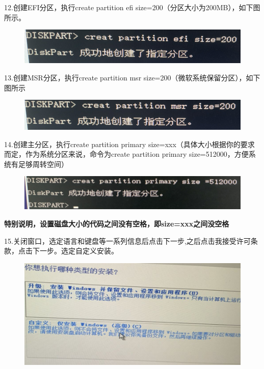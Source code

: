 \documentclass[openbib]{article}
\begin{document}
12.创建EFI分区，执行create partition efi size=200（分区大小为200MB），如下图所示。
\begin{figure}[H]
	\centering
	\includegraphics[scale=0.3]{13}
\end{figure}

13.创建MSR分区，执行create partition msr size=200（微软系统保留分区），如下图所示
\begin{figure}[htbp]
	\centering
	\includegraphics[scale=0.3]{14}
\end{figure}

14.创建主分区，执行create partition primary size=xxx（具体大小根据你的要求而定，作为系统分区来说，命令为create partition primary size=512000，方便系统有足够周转空间）
\begin{figure}[htbp]
	\centering
	\includegraphics[scale=0.3]{15}
\end{figure}

\textbf{特别说明，设置磁盘大小的代码之间没有空格，即size=xxx之间没空格}

15.关闭窗口，选定语言和键盘等一系列信息后点击下一步,之后点击我接受许可条款，点击下一步。选定自定义安装。
\begin{figure}[H]
	\centering
	\includegraphics[scale=0.26]{16}
\end{figure}
\end{document}
